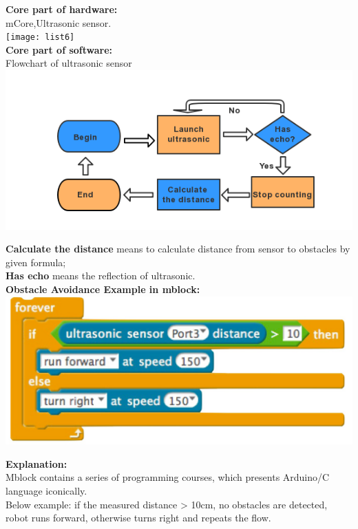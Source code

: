 \documentclass[a0paper,portrait]{baposter}
\begin{document}
\begin{poster}
{
{\textsf{{\color{blue}\textbf{Core part of hardware:\\}} mCore,Ultrasonic sensor.}\\
\texttt{[image: list6]}\\

\textsf{{\color{blue}\textbf{Core part of software:}}
\\
Flowchart of ultrasonic sensor }\cite{deng09study}
\\
\includegraphics[width=1\linewidth]{yes}

\textsf{\textbf{Calculate the distance} means to calculate distance from sensor to obstacles by given formula; \\
\textbf{Has echo} means the reflection of ultrasonic.}\\

\textsf{{\color{blue}\textbf{Obstacle Avoidance Example in mblock:}}}
\center\includegraphics[width=0.95\linewidth]{lego3}

\textsf{\textbf{Explanation: }\\ Mblock contains a series of programming courses, which presents Arduino/C language iconically.\\ Below example: if the measured distance > 10cm, no obstacles are detected, robot runs forward, otherwise turns right and repeats the flow. }
}

}
\end{poster}
\end{document}
